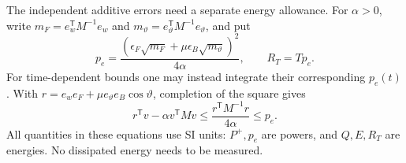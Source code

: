 The independent additive errors need a separate energy allowance.
For $\alpha>0$, write $m_F=e_w^{\mathsf T}M^{-1}e_w$ and
$m_\vartheta=e_\vartheta^{\mathsf T}M^{-1}e_\vartheta$, and put
\begin{equation}
 p_e=\frac{(\epsilon_F\sqrt{m_F}
                    +\mu\epsilon_B\sqrt{m_\vartheta})^2}{4\alpha},
 \qquad R_T=Tp_e.
 \label{eq:operational-additive-reserve}
\end{equation}
For time-dependent bounds one may instead integrate their corresponding
$p_e(t)$. With $r=e_we_F+\mu e_\vartheta e_B\cos\vartheta$, completion of
the square gives
\begin{equation}
 r^{\mathsf T}v-\alpha v^{\mathsf T}Mv
 \leq\frac{r^{\mathsf T}M^{-1}r}{4\alpha}\leq p_e.
 \label{eq:operational-damping-reserve-proof}
\end{equation}
All quantities in these equations use SI units: $P^+,p_e$ are powers,
and $Q,E,R_T$ are energies. No dissipated energy needs to be measured.

